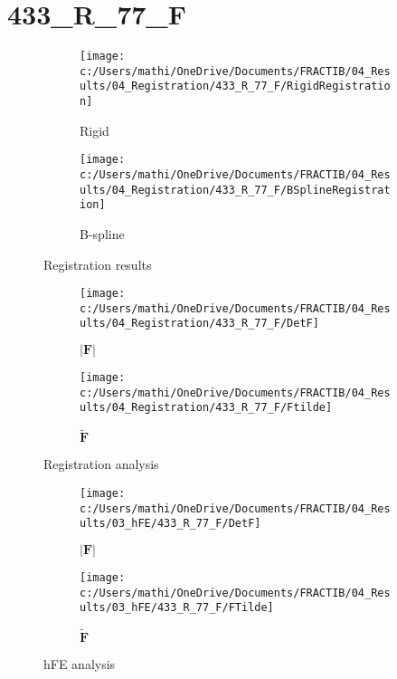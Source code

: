 \documentclass{article}%
\begin{document}
%
\newpage%
\section*{433\_R\_77\_F}%
\label{sec:433R77F}%


\begin{figure}[h!]%
\begin{subfigure}[b]{0.5\linewidth}%
\texttt{[image: c:/Users/mathi/OneDrive/Documents/FRACTIB/04\_Results/04\_Registration/433\_R\_77\_F/RigidRegistration]}%
\caption{Rigid}%
\end{subfigure}%
\begin{subfigure}[b]{0.5\linewidth}%
\texttt{[image: c:/Users/mathi/OneDrive/Documents/FRACTIB/04\_Results/04\_Registration/433\_R\_77\_F/BSplineRegistration]}%
\caption{B{-}spline}%
\end{subfigure}%
\caption{Registration results}%
\end{figure}

%


\begin{figure}[h!]%
\begin{subfigure}[b]{0.5\linewidth}%
\texttt{[image: c:/Users/mathi/OneDrive/Documents/FRACTIB/04\_Results/04\_Registration/433\_R\_77\_F/DetF]}%
\caption{$|\mathbf{F}|$}%
\end{subfigure}%
\begin{subfigure}[b]{0.5\linewidth}%
\texttt{[image: c:/Users/mathi/OneDrive/Documents/FRACTIB/04\_Results/04\_Registration/433\_R\_77\_F/Ftilde]}%
\caption{$\tilde{\mathbf{F}}$}%
\end{subfigure}%
\caption{Registration analysis}%
\end{figure}

%


\begin{figure}[h!]%
\begin{subfigure}[b]{0.5\linewidth}%
\texttt{[image: c:/Users/mathi/OneDrive/Documents/FRACTIB/04\_Results/03\_hFE/433\_R\_77\_F/DetF]}%
\caption{$|\mathbf{F}|$}%
\end{subfigure}%
\begin{subfigure}[b]{0.5\linewidth}%
\texttt{[image: c:/Users/mathi/OneDrive/Documents/FRACTIB/04\_Results/03\_hFE/433\_R\_77\_F/FTilde]}%
\caption{$\tilde{\mathbf{F}}$}%
\end{subfigure}%
\caption{hFE analysis}%
\end{figure}
\end{document}
